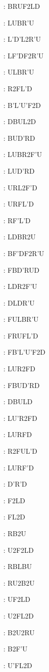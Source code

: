 \documentclass[9pt]{article}
\begin{document}
{\begin{multicols}{6}
: BRUF2LD

: LUBR'U

: L'D'L2R'U

: LF'DF2R'U

: ULBR'U

: R2FL'D

: B'L'U'F2D

: DBUL2D

: BUD'RD

: LUBR2F'U

: LUD'RD

: URL2F'D

: URFL'D

: RF'L'D

: LDBR2U

: BF'DF2R'U

: FBD'RUD

: LDR2F'U

: DLDR'U

: FULBR'U

: FRUFL'D

: FB'L'U'F2D

: LUR2FD

: FBUD'RD

: DBULD

: LU'R2FD

: LURFD

: R2FUL'D

: LURF'D

: D'R'D

: F2LD

: FL2D

: RB2U

: U2F2LD

: RBLBU

: RU2B2U

: UF2LD

: U2FL2D

: B2U2RU

: B2F'U

: U'FL2D


\end{multicols}}
\end{document}

